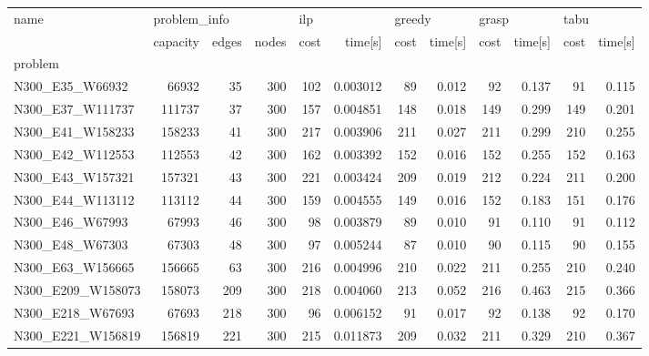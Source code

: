\begin{landscape}
\begin{table}
\centering
\begin{tabular}{lrrrrrrrrrrr}
\toprule
name & \multicolumn{3}{l}{problem\_info} & \multicolumn{2}{l}{ilp} & \multicolumn{2}{l}{greedy} & \multicolumn{2}{l}{grasp} & \multicolumn{2}{l}{tabu} \\
{} &     capacity & edges & nodes & cost &   time[s] &   cost & time[s] &  cost & time[s] & cost & time[s] \\
problem           &              &       &       &      &           &        &         &       &         &      &         \\
\midrule
N300\_E35\_W66932   &        66932 &    35 &   300 &  102 &  0.003012 &     89 &   0.012 &    92 &   0.137 &   91 &   0.115 \\
N300\_E37\_W111737  &       111737 &    37 &   300 &  157 &  0.004851 &    148 &   0.018 &   149 &   0.299 &  149 &   0.201 \\
N300\_E41\_W158233  &       158233 &    41 &   300 &  217 &  0.003906 &    211 &   0.027 &   211 &   0.299 &  210 &   0.255 \\
N300\_E42\_W112553  &       112553 &    42 &   300 &  162 &  0.003392 &    152 &   0.016 &   152 &   0.255 &  152 &   0.163 \\
N300\_E43\_W157321  &       157321 &    43 &   300 &  221 &  0.003424 &    209 &   0.019 &   212 &   0.224 &  211 &   0.200 \\
N300\_E44\_W113112  &       113112 &    44 &   300 &  159 &  0.004555 &    149 &   0.016 &   152 &   0.183 &  151 &   0.176 \\
N300\_E46\_W67993   &        67993 &    46 &   300 &   98 &  0.003879 &     89 &   0.010 &    91 &   0.110 &   91 &   0.112 \\
N300\_E48\_W67303   &        67303 &    48 &   300 &   97 &  0.005244 &     87 &   0.010 &    90 &   0.115 &   90 &   0.155 \\
N300\_E63\_W156665  &       156665 &    63 &   300 &  216 &  0.004996 &    210 &   0.022 &   211 &   0.255 &  210 &   0.240 \\
N300\_E209\_W158073 &       158073 &   209 &   300 &  218 &  0.004060 &    213 &   0.052 &   216 &   0.463 &  215 &   0.366 \\
N300\_E218\_W67693  &        67693 &   218 &   300 &   96 &  0.006152 &     91 &   0.017 &    92 &   0.138 &   92 &   0.170 \\
N300\_E221\_W156819 &       156819 &   221 &   300 &  215 &  0.011873 &    209 &   0.032 &   211 &   0.329 &  210 &   0.367 \\

\end{tabular}
\end{table}
\end{landscape}
